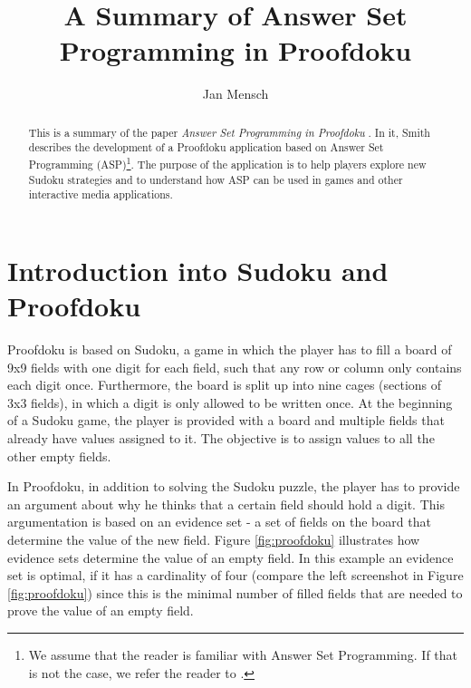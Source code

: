 \documentclass[runningheads]{llncs}
\newcommand{\papertitle}{Answer Set Programming in Proofdoku}
\newcommand{\authorquote}{Smith}
\begin{document}
\title{A Summary of \papertitle}

\author{Jan Mensch}




%
\maketitle              %
%
\begin{abstract}
This is a summary of the paper \textit{\papertitle} \cite{nogueira2001prolog}. In it, \authorquote{} describes the development of a Proofdoku application based on Answer Set Programming (ASP)\footnote{We assume that the reader is familiar with Answer Set Programming. If that is not the case, we refer the reader to \cite{erdem2016applications}.}. The purpose of the application is to help players explore new Sudoku strategies and to understand how ASP can be used in games and other interactive media applications.
\end{abstract}


\section{Introduction into Sudoku and Proofdoku} \label{sec:concept}

Proofdoku is based on Sudoku, a game in which the player has to fill a board of 9x9 fields with one digit for each field, such that any row or column only contains each digit once. Furthermore, the board is split up into nine cages (sections of 3x3 fields), in which a digit is only allowed to be written once. At the beginning of a Sudoku game, the player is provided with a board and multiple fields that already have values assigned to it. The objective is to assign values to all the other empty fields. 

In Proofdoku, in addition to solving the Sudoku puzzle, the player has to provide an argument about why he thinks that a certain field should hold a digit. This argumentation is based on an evidence set - a set of fields on the board that determine the value of the new field. Figure \ref{fig:proofdoku} illustrates how evidence sets determine the value of an empty field. In this example an evidence set is optimal, if it has a cardinality of four (compare the left screenshot in Figure \ref{fig:proofdoku}) since this is the minimal number of filled fields that are needed to prove the value of an empty field. 
\end{document}
